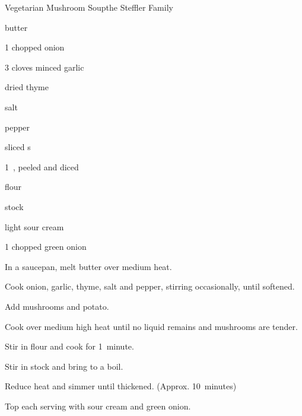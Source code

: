 \begin{recipe}{Vegetarian Mushroom Soup}{the Steffler Family}{}

\begin{ingredients}
\item {} butter
\item 1 chopped onion
\item 3 cloves minced garlic
\item \tp{\half} dried thyme
\item \tp{\quarter} salt
\item \tp{\quarter} pepper
\item {} sliced s
\item 1~, peeled and diced
\item \C{\quarter} flour
\item {} stock
\item \C{\quarter} light sour cream
\item 1 chopped green onion
\end{ingredients}

\begin{directions}
\item In a saucepan, melt butter over medium heat.
\item Cook onion, garlic, thyme, salt and pepper, stirring occasionally, until softened.
\item Add mushrooms and potato.
\item Cook over medium high heat until no liquid remains and mushrooms are tender.
\item Stir in flour and cook for 1~minute.
\item Stir in stock and bring to a boil.
\item Reduce heat and simmer until thickened. (Approx. 10~minutes)
\item Top each serving with sour cream and green onion.
\end{directions}
\end{recipe}
